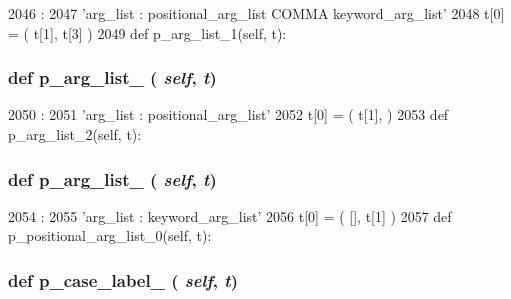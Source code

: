 \begin{DoxyCode}
2046                              :
2047         'arg_list : positional_arg_list COMMA keyword_arg_list'
2048         t[0] = ( t[1], t[3] )
2049 
    def p_arg_list_1(self, t):
\end{DoxyCode}
\hypertarget{classisa__parser_1_1ISAParser_a92585e35bfede68f13b18d7e34e8782f}{
\subsubsection[{p\_\-arg\_\-list\_\-1}]{\setlength{\rightskip}{0pt plus 5cm}def p\_\-arg\_\-list\_ ( {\em self}, \/   {\em t})}}
\label{classisa__parser_1_1ISAParser_a92585e35bfede68f13b18d7e34e8782f}



\begin{DoxyCode}
2050                              :
2051         'arg_list : positional_arg_list'
2052         t[0] = ( t[1], {} )
2053 
    def p_arg_list_2(self, t):
\end{DoxyCode}
\hypertarget{classisa__parser_1_1ISAParser_a0c7ca8817b528e0a5f014d6dc00e3609}{
\subsubsection[{p\_\-arg\_\-list\_\-2}]{\setlength{\rightskip}{0pt plus 5cm}def p\_\-arg\_\-list\_ ( {\em self}, \/   {\em t})}}
\label{classisa__parser_1_1ISAParser_a0c7ca8817b528e0a5f014d6dc00e3609}



\begin{DoxyCode}
2054                              :
2055         'arg_list : keyword_arg_list'
2056         t[0] = ( [], t[1] )
2057 
    def p_positional_arg_list_0(self, t):
\end{DoxyCode}
\hypertarget{classisa__parser_1_1ISAParser_a699cea1c54c1f747f671b33450b39439}{
\subsubsection[{p\_\-case\_\-label\_\-0}]{\setlength{\rightskip}{0pt plus 5cm}def p\_\-case\_\-label\_ ( {\em self}, \/   {\em t})}}
\label{classisa__parser_1_1ISAParser_a699cea1c54c1f747f671b33450b39439}



